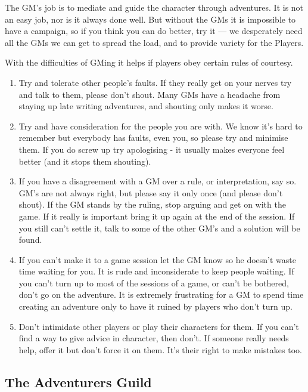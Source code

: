 \documentclass[twoside,a4paper]{article}
\begin{document}
\begin{multicols}{2}
The GM's job is to mediate and guide the character through
adventures.  It is not an easy job, nor is it always done well.  But
without the GMs it is impossible to have a campaign, so if you think
you can do better, try it --- we desperately need all the GMs we can
get to spread the load, and to provide variety for the Players.

With the difficulties of GMing it helps if players obey certain rules
of courtesy.

\begin{enumerate}
\item
Try and tolerate other people's faults.  If they really get on your
nerves try and talk to them, please don't shout. Many GMs have a
headache from staying up late writing adventures, and shouting only
makes it worse.

\item
Try and have consideration for the people you are with.  We know it's
hard to remember but everybody has faults, even you, so please try and
minimise them.  If you do screw up try apologising - it usually makes
everyone feel better (and it stops them shouting).

\item
If you have a disagreement with a GM over a rule, or interpretation,
say so.  GM's are not always right, but please say it only once (and
please don't shout).  If the GM stands by the ruling, stop arguing and
get on with the game.  If it really is important bring it up again at
the end of the session. If you still can't settle it, talk to some of
the other GM's and a solution will be found.

\item
If you can't make it to a game session let the GM know so he doesn't
waste time waiting for you.  It is rude and inconsiderate to keep
people waiting.  If you can't turn up to most of the sessions of a
game, or can't be bothered, don't go on the adventure.  It is
extremely frustrating for a GM to spend time creating an adventure
only to have it ruined by players who don't turn up.

\item
Don't intimidate other players or play their characters for them.  If
you can't find a way to give advice in character, then don't.  If
someone really needs help, offer it but don't force it on them.  It's
their right to make mistakes too.

\end{enumerate}

\subsection{The Adventurers Guild}


\end{multicols}
\end{document}

